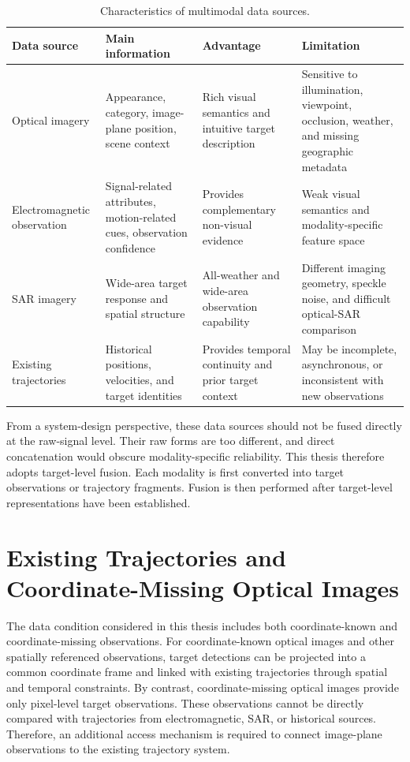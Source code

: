 \begin{table}[htb]
  \centering
  \caption{Characteristics of multimodal data sources.}
  \label{tab:chapter2-data-source}
  \small
  \begin{tabular}{p{}p{}p{}p{}}
    \toprule
    Data source & Main information & Advantage & Limitation \\
    \midrule
    Optical imagery & Appearance, category, image-plane position, scene context & Rich visual semantics and intuitive target description & Sensitive to illumination, viewpoint, occlusion, weather, and missing geographic metadata \\
    Electromagnetic observation & Signal-related attributes, motion-related cues, observation confidence & Provides complementary non-visual evidence & Weak visual semantics and modality-specific feature space \\
    SAR imagery & Wide-area target response and spatial structure & All-weather and wide-area observation capability & Different imaging geometry, speckle noise, and difficult optical-SAR comparison \\
    Existing trajectories & Historical positions, velocities, and target identities & Provides temporal continuity and prior target context & May be incomplete, asynchronous, or inconsistent with new observations \\
    \bottomrule
  \end{tabular}
\end{table}

From a system-design perspective, these data sources should not be fused directly at the raw-signal level. Their raw forms are too different, and direct concatenation would obscure modality-specific reliability. This thesis therefore adopts target-level fusion. Each modality is first converted into target observations or trajectory fragments. Fusion is then performed after target-level representations have been established.

\section{Existing Trajectories and Coordinate-Missing Optical Images}
The data condition considered in this thesis includes both coordinate-known and coordinate-missing observations. For coordinate-known optical images and other spatially referenced observations, target detections can be projected into a common coordinate frame and linked with existing trajectories through spatial and temporal constraints. By contrast, coordinate-missing optical images provide only pixel-level target observations. These observations cannot be directly compared with trajectories from electromagnetic, SAR, or historical sources. Therefore, an additional access mechanism is required to connect image-plane observations to the existing trajectory system.

